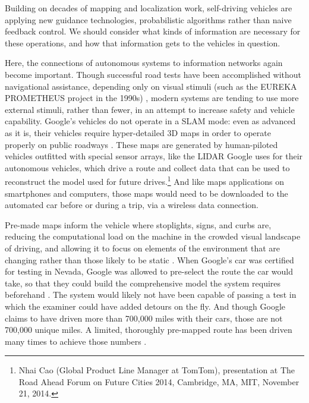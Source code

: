 Building on decades of mapping and localization work, self-driving
vehicles are applying new guidance technologies, probabilistic
algorithms rather than naive feedback control. We should consider what
kinds of information are necessary for these operations, and how that
information gets to the vehicles in question.

Here, the connections of autonomous systems to information networks
again become important. Though successful
road tests have been accomplished without navigational assistance,
depending only on visual stimuli (such as the EUREKA PROMETHEUS project
in the 1990s) \cite{ulmerVITA}, modern systems are tending to use more external
stimuli, rather than fewer, in an attempt to increase safety and
vehicle capability. Google's vehicles do not operate in a SLAM mode: even as
advanced as it is, their vehicles require
hyper-detailed 3D maps in order to operate properly on public
roadways \cite{gomesObstacles}. These maps are generated by human-piloted vehicles outfitted with
special sensor arrays, like the LIDAR Google uses for their autonomous
vehicles, which drive a route and collect data that can be used to
reconstruct the model used for future drives.\footnote{Nhai Cao
  (Global Product Line Manager at TomTom), presentation at The Road
  Ahead Forum on Future Cities 2014, Cambridge, MA, MIT, November 21,
  2014.} And like maps applications on smartphones and computers,
those maps would need to be downloaded to the automated car before or
during a trip, via a wireless data connection.


Pre-made maps inform the vehicle where stoplights, signs,
and curbs are, reducing the computational load on the machine in the
crowded visual landscape of driving, and allowing it to focus on
elements of the environment that are changing rather than those likely
to be static \cite{gomesObstacles}. When Google's car was certified for
testing in Nevada, Google was allowed to pre-select the route the car
would take, so that they could build the comprehensive model the
system requires beforehand \cite{harrisNevada}. The system would likely not have been
capable of passing a test in which the examiner could have added
detours on the fly. And though Google claims to have driven more than
700,000 miles with their cars, those are not 700,000 unique miles. A
limited, thoroughly pre-mapped route has been driven many times to
achieve those numbers \cite{gomesCircles}.

